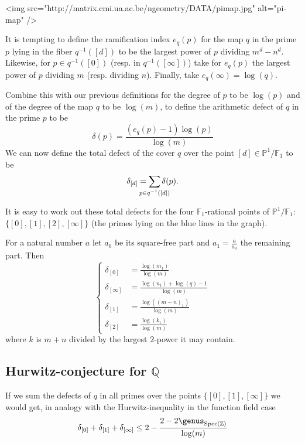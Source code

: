 <img src="http://matrix.cmi.ua.ac.be/ngeometry/DATA/pimap.jpg" alt="pi-map" />

It is tempting to define the ramification index $e_q(p)$ for the map $q$ in the prime $p$ lying in the fiber $q^{-1}([d])$ to be the largest power of $p$ dividing $m^d-n^d$. Likewise, for $p \in q^{-1}([0])$ (resp. in $q^{-1}([\infty])$) take for $e_q(p)$ the largest power of $p$ dividing $m$ (resp. dividing $n$). Finally, take $e_q(\infty) = \log(q)$.

Combine this with our previous definitions for the degree of $p$ to be $\log(p)$ and of the degree of the map $q$ to be $\log(m)$, to define the arithmetic defect of $q$ in the prime $p$ to be
\begin{equation}
  \delta(p) = \frac{(e_q(p)-1) \log(p)}{\log(m)}
\end{equation}
We can now define the total defect of the cover $q$ over the point $[d] \in \mathbb{P}^1 / \mathbb{F}_1$ to be
\begin{equation}
  \delta_{[d]} = \sum_{\mathclap{p \in q^{-1}([d])}} \delta(p).
\end{equation}

It is easy to work out these total defects for the four $\mathbb{F}_1$-rational points of $\mathbb{P}^1 / \mathbb{F}_1$: $\{ [0],[1],[2],[\infty] \}$ (the primes lying on the blue lines in the graph). 

For a natural number $a$ let $a_0$ be its square-free part and $a_1 = \tfrac{a}{a_0}$ the remaining part. Then
\begin{equation}
  \left\{
  \begin{aligned}
	  \delta_{[0]} &= \frac{\log(m_1)}{\log(m)} \\
	  \delta_{[\infty]} &= \frac{\log(n_1)+\log(q)-1}{\log(m)} \\
	  \delta_{[1]} &= \frac{\log((m-n)_1)}{\log(m)} \\
	  \delta_{[2]} &= \frac{\log(k_1)}{\log(m)}
  \end{aligned}
  \right.
\end{equation}
where $k$ is $m+n$ divided by the largest $2$-power it may contain. 

\subsection{Hurwitz-conjecture for $\mathbb{Q}$}

If we sum the defects of $q$ in all primes over the points $\{ [0],[1],[\infty] \}$ we would get, in analogy with the Hurwitz-inequality in the function field case
\begin{equation}
  \delta_{[0]}+\delta_{[1]}+\delta_{[\infty]} \leq 2 - \frac{2 - 2\genus_{\Spec(\mathbb{Z})}}{\log(m)}
\end{equation}

